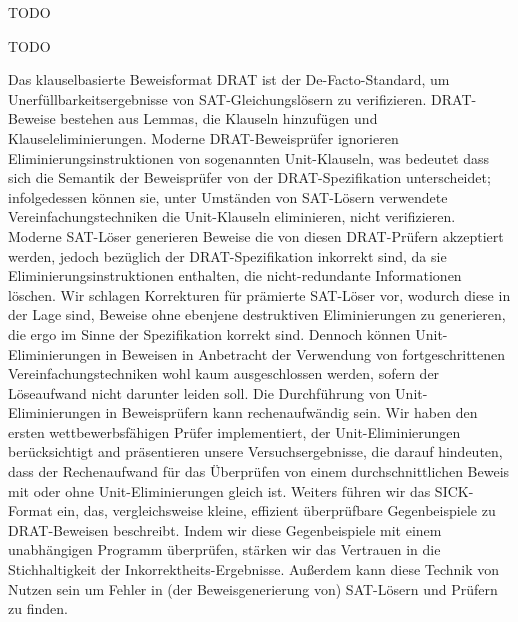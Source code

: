 \documentclass[draft,final]{vutinfth} %
\begin{document}
\frontmatter %

\addstatementpage

\begin{danksagung*}
    TODO
\end{danksagung*}

\begin{acknowledgements*}
    TODO
\end{acknowledgements*}
\fi

\begin{kurzfassung}

Das klauselbasierte Beweisformat DRAT ist der De-Facto-Standard, um
Unerfüllbarkeitsergebnisse von SAT-Gleichungslösern zu verifizieren.
DRAT-Beweise bestehen aus Lemmas, die Klauseln hinzufügen
und Klauseleliminierungen.  Moderne DRAT-Beweisprüfer ignorieren
Eliminierungsinstruktionen von sogenannten Unit-Klauseln, was bedeutet dass
sich die Semantik der Beweisprüfer von der DRAT-Spezifikation unterscheidet;
infolgedessen können sie, unter Umständen von SAT-Lösern verwendete
Vereinfachungstechniken die Unit-Klauseln eliminieren, nicht verifizieren.
Moderne SAT-Löser generieren Beweise die von diesen DRAT-Prüfern akzeptiert
werden, jedoch bezüglich der DRAT-Spezifikation inkorrekt sind, da sie
Eliminierungsinstruktionen enthalten, die nicht-redundante Informationen
löschen.  Wir schlagen Korrekturen für prämierte SAT-Löser vor, wodurch
diese in der Lage sind, Beweise ohne ebenjene destruktiven Eliminierungen
zu generieren, die ergo im Sinne der Spezifikation korrekt sind. Dennoch
können Unit-Eliminierungen in Beweisen in Anbetracht der Verwendung von
fortgeschrittenen Vereinfachungstechniken wohl kaum ausgeschlossen werden,
sofern der Löseaufwand nicht darunter leiden soll.  Die Durchführung von
Unit-Eliminierungen in Beweisprüfern kann rechenaufwändig sein.  Wir haben
den ersten wettbewerbsfähigen Prüfer implementiert, der Unit-Eliminierungen
berücksichtigt and präsentieren unsere Versuchsergebnisse, die darauf
hindeuten, dass der Rechenaufwand für das Überprüfen von einem
durchschnittlichen Beweis mit oder ohne Unit-Eliminierungen gleich ist.
Weiters führen wir das SICK-Format ein, das, vergleichsweise kleine, effizient
überprüfbare Gegenbeispiele zu DRAT-Beweisen beschreibt. Indem wir diese
Gegenbeispiele mit einem unabhängigen Programm überprüfen, stärken wir das
Vertrauen in die Stichhaltigkeit der Inkorrektheits-Ergebnisse.  Außerdem
kann diese Technik von Nutzen sein um Fehler in (der Beweisgenerierung von)
SAT-Lösern und Prüfern zu finden.

\end{kurzfassung}
\end{document}
